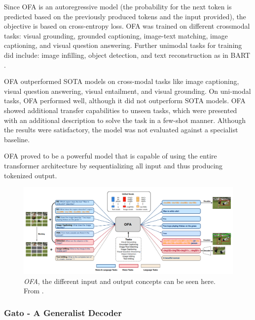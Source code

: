 \documentclass[
]{krantz}
\begin{document}
Since OFA is an autoregressive model (the probability for the next token is predicted based on the previously produced tokens and the input provided), the objective is based on cross-entropy loss.
OFA was trained on different crossmodal tasks: visual grounding, grounded captioning, image-text matching, image captioning, and visual question answering. Further unimodal tasks for training did
include: image infilling, object detection, and text reconstruction as in BART \citep{lewis-etal-2020-bart}.

OFA outperformed SOTA models on cross-modal tasks like image captioning, visual question answering, visual entailment, and visual grounding. On uni-modal tasks, OFA performed well, although it
did not outperform SOTA models. OFA showed additional transfer capabilities to unseen tasks, which were presented with an additional description to solve the task in a few-shot manner. Although
the results were satisfactory, the model was not evaluated against a specialist baseline.

OFA proved to be a powerful model that is capable of using the entire transformer architecture by sequentializing all input and thus producing tokenized output.

\begin{figure}

{\centering \includegraphics[width=1\linewidth]{figures/03-03-multipurpose/OFA} 

}

\caption{\emph{OFA}, the different input and output concepts can be seen here. From \citet{Wang2022}.}\label{fig:ofa}
\end{figure}



\hypertarget{gato---a-generalist-decoder}{%
\subsubsection{Gato - A Generalist Decoder}\label{gato---a-generalist-decoder}}
\end{document}
